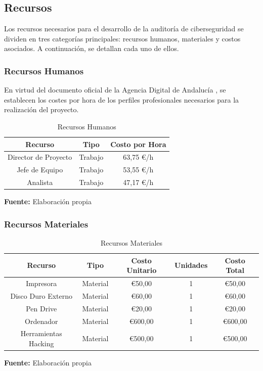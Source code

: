 \documentclass[a4paper, 10pt]{article}
\begin{document}
\subsection{Recursos}

Los recursos necesarios para el desarrollo de la auditoría de ciberseguridad se dividen en tres categorías principales: recursos humanos, materiales y costos asociados. A continuación, se detallan cada uno de ellos.

\subsubsection{Recursos Humanos}

En virtud del documento oficial de la Agencia Digital de Andalucía \cite{agencia_digital}, se establecen los costes por hora de los perfiles profesionales necesarios para la realización del proyecto.

\begin{table}[H]
\caption{Recursos Humanos}
\centering
\renewcommand{\arraystretch}{1.5}
\begin{tabular}{|c|c|c|}
\hline
\textbf{Recurso} & \textbf{Tipo} & \textbf{Costo por Hora}  \\ \hline
Director de Proyecto & Trabajo & 63,75 €/h  \\ \hline
Jefe de Equipo & Trabajo & 53,55 €/h  \\ \hline
Analista & Trabajo & 47,17 €/h  \\ \hline
\end{tabular}
\begin{flushleft}\centering
    \footnotesize \textbf{Fuente:} Elaboración propia
\end{flushleft}   
\label{tab:recursos_humanos}
\end{table}



\subsubsection{Recursos Materiales}
\begin{table}[H]
\caption{Recursos Materiales}
\centering
\renewcommand{\arraystretch}{1.5}
\begin{tabular}{|c|c|c|c|c|}
\hline
\textbf{Recurso} & \textbf{Tipo} & \textbf{Costo Unitario} & \textbf{Unidades} & \textbf{Costo Total}  \\ \hline
Impresora & Material & €50,00 & 1& €50,00  \\ \hline
Disco Duro Externo & Material &  €60,00 &1& €60,00  \\ \hline
Pen Drive & Material & €20,00 & 1& €20,00  \\ \hline
Ordenador & Material & €600,00 & 1& €600,00  \\ \hline
Herramientas Hacking & Material & €500,00 & 1& €500,00  \\ \hline
\end{tabular}
\begin{flushleft}\centering
    \footnotesize \textbf{Fuente:} Elaboración propia
\end{flushleft}   
\label{tab:recursos_materiales}
\end{table}
\end{document}
